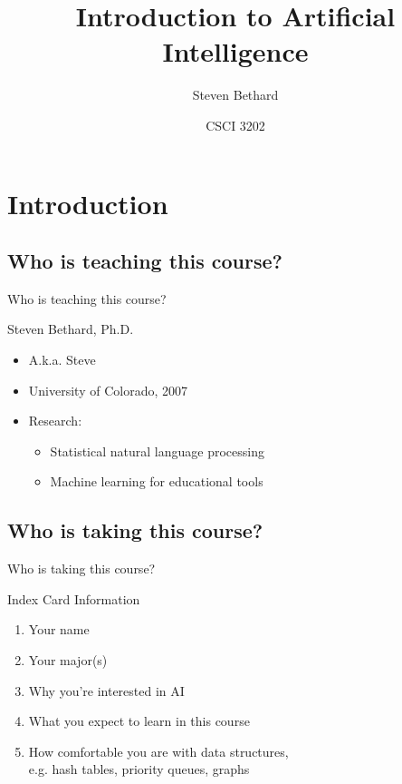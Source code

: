 \documentclass[12pt]{beamer}
\title{Introduction to Artificial Intelligence}
\author{Steven Bethard}
\institute{
  Department of Computer Science\\
  University of Colorado
}
\date{CSCI 3202}
\begin{document}
\begin{frame}
  \titlepage
\end{frame}

\section*{Introduction}

\subsection{Who is teaching this course?}
\begin{frame}{Who is teaching this course?}
	\begin{block}{Steven Bethard, Ph.D.}
		\begin{itemize}
			\item A.k.a. Steve
			\item University of Colorado, 2007
			\item Research:
				\begin{itemize}
					\item Statistical natural language processing
					\item Machine learning for educational tools
				\end{itemize}
		\end{itemize}
	\end{block}
\end{frame}

\subsection{Who is taking this course?}
\begin{frame}{Who is taking this course?}
	\begin{block}{Index Card Information}
		\begin{enumerate}
			\item Your name
			\item Your major(s)
			\item Why you're interested in AI
			\item What you expect to learn in this course
			\item How comfortable you are with data structures, \\
			      e.g. hash tables, priority queues, graphs
		\end{enumerate}
	\end{block}
\end{frame}
\end{document}
